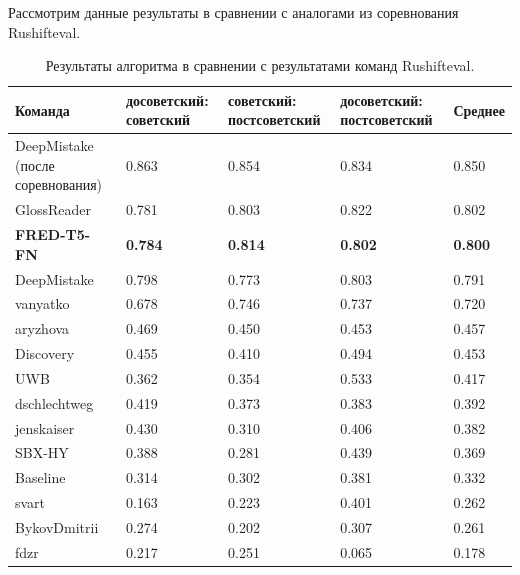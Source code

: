 \documentclass[LI,VKR]{HSEUniversity}
\begin{document}
Рассмотрим данные результаты в сравнении с аналогами из соревнования Rushifteval.

\begin{table}[H]
\centering
\caption{Результаты алгоритма в сравнении с результатами команд Rushifteval.}
\begin{tabular}{|m{2.5cm}|m{3cm}|m{3cm}|m{3cm}|m{2.0cm}|}%
\hline
\textbf{Команда} & \textbf{досоветский:
советский} & \textbf{советский:
постсоветский} & \textbf{досоветский:
постсоветский} & \textbf{Среднее} \\%
\hline
DeepMistake (после соревнования) & 0.863 & 0.854 & 0.834 & 0.850 \\%
\hline
GlossReader & 0.781 & 0.803 & 0.822 & 0.802 \\%
\hline
\textbf{FRED-T5-FN} & \textbf{0.784} & \textbf{0.814} & \textbf{0.802} & \textbf{0.800} \\%
\hline
DeepMistake & 0.798 & 0.773 & 0.803 & 0.791 \\%
\hline
vanyatko & 0.678 & 0.746 & 0.737 & 0.720 \\%
\hline
aryzhova & 0.469 & 0.450 & 0.453 & 0.457 \\%
\hline
Discovery & 0.455 & 0.410 & 0.494 & 0.453 \\%
\hline
UWB & 0.362 & 0.354 & 0.533 & 0.417 \\%
\hline
dschlechtweg & 0.419 & 0.373 & 0.383 & 0.392 \\%
\hline
jenskaiser & 0.430 & 0.310 & 0.406 & 0.382 \\%
\hline
SBX-HY & 0.388 & 0.281 & 0.439 & 0.369 \\%
\hline
Baseline & 0.314 & 0.302 & 0.381 & 0.332 \\%
\hline
svart & 0.163 & 0.223 & 0.401 & 0.262 \\%
\hline
BykovDmitrii & 0.274 & 0.202 & 0.307 & 0.261 \\%
\hline
fdzr & 0.217 & 0.251 & 0.065 & 0.178 \\%
\hline
\end{tabular}
\end{table}
\end{document}
